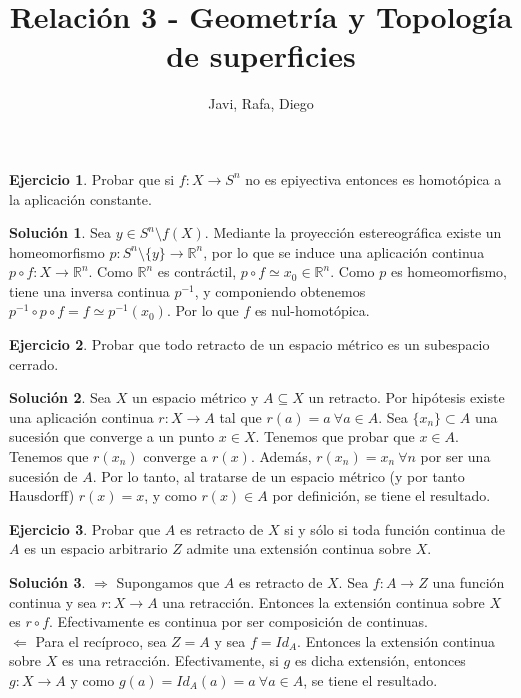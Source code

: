 \documentclass{article}
\theoremstyle{plain}
\theoremstyle{definition}
\newtheorem{exercise}{Ejercicio}
\newtheorem*{sol*}{Solución}
\newcommand{\R}{\mathbb{R}}
\begin{document}
\title{Relación 3 - Geometría y Topología de superficies }
\author{Javi, Rafa, Diego}
\maketitle
\begin{exercise}
Probar que si $f:X\to S^n$ no es epiyectiva entonces es homotópica a la aplicación constante.
\end{exercise}
\begin{sol*}
Sea $y\in S^n\setminus f(X)$. Mediante la proyección estereográfica existe un homeomorfismo $p:S^n\setminus\{y\}\to\R^n$, por lo que se induce una aplicación continua $p\circ f:X\to\R^n$. Como $\R^n$ es contráctil, $p\circ f\simeq x_0\in\R^n$. Como $p$ es homeomorfismo, tiene una inversa continua $p^{-1}$, y componiendo obtenemos $p^{-1}\circ p\circ f= f\simeq p^{-1}(x_0)$. Por lo que $f$ es nul-homotópica. 
\end{sol*}
\newpage
\begin{exercise}
Probar que todo retracto de un espacio métrico es un subespacio cerrado.
\end{exercise}
\begin{sol*}
Sea $X$ un espacio métrico y $A\subseteq X$ un retracto. Por hipótesis existe una aplicación continua $r:X\to A$ tal que $r(a)=a\ \forall a\in A$. Sea $\{x_n\}\subset A$ una sucesión que converge a un punto $x\in X$. Tenemos que probar que $x\in A$. Tenemos que $r(x_n)$ converge a $r(x)$. Además, $r(x_n)=x_n\ \forall n$ por ser una sucesión de $A$. Por lo tanto, al tratarse de un espacio métrico (y por tanto Hausdorff) $r(x)=x$, y como $r(x)\in A$ por definición, se tiene el resultado. 
\end{sol*}
\newpage
\begin{exercise}
Probar que $A$ es retracto de $X$ si y sólo si toda función continua de $A$ es un espacio arbitrario $Z$ admite una extensión continua sobre $X$.
\end{exercise}
\begin{sol*}
$\boxed{\Rightarrow}$ Supongamos que $A$ es retracto de $X$. Sea $f:A\to Z$ una función continua y sea $r:X\to A$ una retracción. Entonces la extensión continua sobre $X$ es $r\circ f$. Efectivamente es continua por ser composición de continuas.\\
$\boxed{\Leftarrow}$ Para el recíproco, sea $Z=A$ y sea $f=Id_A$. Entonces la extensión continua sobre $X$ es una retracción. Efectivamente, si $g$ es dicha extensión, entonces $g:X\to A$ y como $g(a)=Id_A(a)=a\ \forall a\in A$, se tiene el resultado. 
\end{sol*}
\end{document}
